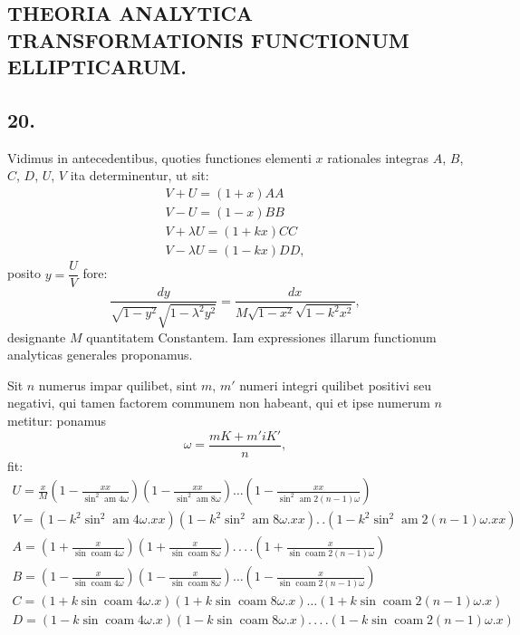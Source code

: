 \documentclass{article}
\begin{document}

\subsection*{THEORIA ANALYTICA TRANSFORMATIONIS FUNCTIONUM ELLIPTICARUM.}

\subsection*{20.}

Vidimus in antecedentibus, quoties functiones elementi $x$ rationales integras $A$, $B$, $C$, $D$, $U$, $V$ ita determinentur, ut sit:
\[
\begin{gathered}
V+U=(1+x)AA\\
V-U=(1-x)BB\\
V+\lambda U=(1+kx)CC\\
V-\lambda U=(1-kx)DD,
\end{gathered}
\]
posito $y=\dfrac{U}{V}$ fore:
\[
\frac{dy}{\sqrt{1-y^{2}}\sqrt{1-\lambda^{2}y^{2}}}=\frac{dx}{M\sqrt{1-x^{2}}\sqrt{1-k^{2}x^{2}}},
\]
designante $M$ quantitatem Constantem. Iam expressiones illarum functionum analyticas generales proponamus.

Sit $n$ numerus impar quilibet, sint $m$, $m'$ numeri integri quilibet positivi seu negativi, qui tamen factorem communem non habeant, qui et ipse numerum $n$ metitur: ponamus
\[
\omega=\frac{mK+m'iK'}{n},
\]
fit:
\[
\begin{gathered}
U=\frac{x}{M}\left(1-\frac{xx}{\sin^{2}\operatorname{am}4\omega}\right)\left(1-\frac{xx}{\sin^{2}\operatorname{am}8\omega}\right)\ldots\left(1-\frac{xx}{\sin^{2}\operatorname{am}2(n-1)\omega}\right)\\[1.5ex]
V=\left(1-k^{2}\sin^{2}\operatorname{am}4\omega.xx\right)\left(1-k^{2}\sin^{2}\operatorname{am}8\omega.xx\right).\,.\left(1-k^{2}\sin^{2}\operatorname{am}2(n-1)\omega.xx\right)\\[1.5ex]
A=\left(1+\frac{x}{\sin\operatorname{coam}4\omega}\right)\left(1+\frac{x}{\sin\operatorname{coam}8\omega}\right).\,.\,.\,.\left(1+\frac{x}{\sin\operatorname{coam}2(n-1)\omega}\right)\\[1.5ex]
B=\left(1-\frac{x}{\sin\operatorname{coam}4\omega}\right)\left(1-\frac{x}{\sin\operatorname{coam}8\omega}\right)\ldots\left(1-\frac{x}{\sin\operatorname{coam}2(n-1)\omega}\right)\\[1.5ex]
C=\left(1+k\sin\operatorname{coam}4\omega.x\right)\left(1+k\sin\operatorname{coam}8\omega.x\right)\ldots\left(1+k\sin\operatorname{coam}2(n-1)\omega.x\right)\\[1.5ex]
D=\left(1-k\sin\operatorname{coam}4\omega.x\right)\left(1-k\sin\operatorname{coam}8\omega.x\right).\,.\,.\,.\left(1-k\sin\operatorname{coam}2(n-1)\omega.x\right)
\end{gathered}
\]
\end{document}
